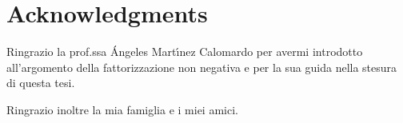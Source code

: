\chapter*{Acknowledgments}
\thispagestyle{plain}

Ringrazio la prof.ssa \'Angeles Mart\'{\i}nez Calomardo per avermi introdotto all'argomento della fattorizzazione non negativa e per la sua guida nella stesura di questa tesi.

Ringrazio inoltre la mia famiglia e i miei amici.

\clearpage